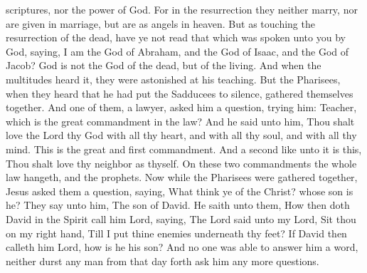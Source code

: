scriptures, nor the power of God. For in the resurrection they neither marry, nor are given in marriage, but are as angels in heaven. But as touching the resurrection of the dead, have ye not read that which was spoken unto you by God, saying, I am the God of Abraham, and the God of Isaac, and the God of Jacob? God is not the God of the dead, but of the living. And when the multitudes heard it, they were astonished at his teaching.  But the Pharisees, when they heard that he had put the Sadducees to silence, gathered themselves together. And one of them, a lawyer, asked him a question, trying him: Teacher, which is the great commandment in the law? And he said unto him, Thou shalt love the Lord thy God with all thy heart, and with all thy soul, and with all thy mind. This is the great and first commandment. And a second like unto it is this, Thou shalt love thy neighbor as thyself. On these two commandments the whole law hangeth, and the prophets.  Now while the Pharisees were gathered together, Jesus asked them a question, saying, What think ye of the Christ? whose son is he? They say unto him, The son of David. He saith unto them, How then doth David in the Spirit call him Lord, saying,  The Lord said unto my Lord, Sit thou on my right hand, Till I put thine enemies underneath thy feet?  If David then calleth him Lord, how is he his son? And no one was able to answer him a word, neither durst any man from that day forth ask him any more questions. 

